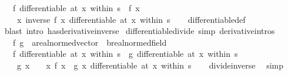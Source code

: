 \begin{isabellebody}
\ \ \ {\isachardoublequoteopen}f\ differentiable\ {\isacharparenleft}{\kern0pt}at\ x\ within\ s{\isacharparenright}{\kern0pt}\ {\isasymLongrightarrow}\ f\ x\ {\isasymnoteq}\ {}\ {\isasymLongrightarrow}\isanewline
\ \ \ \ {\isacharparenleft}{\kern0pt}{\isasymlambda}x{\isachardot}{\kern0pt}\ inverse\ {\isacharparenleft}{\kern0pt}f\ x{\isacharparenright}{\kern0pt}{\isacharparenright}{\kern0pt}\ differentiable\ {\isacharparenleft}{\kern0pt}at\ x\ within\ s{\isacharparenright}{\kern0pt}{\isachardoublequoteclose}\isanewline
%
\isadelimproof
\ \ %
\endisadelimproof
%
\isatagproof
{}\isamarkupfalse%
\ differentiable{\isacharunderscore}{\kern0pt}def\ \isamarkupfalse%
\ {\isacharparenleft}{\kern0pt}blast\ intro{\isacharcolon}{\kern0pt}\ has{\isacharunderscore}{\kern0pt}derivative{\isacharunderscore}{\kern0pt}inverse{\isacharparenright}{\kern0pt}%
\endisatagproof
{\isafoldproof}%
%
\isadelimproof
\isanewline
%
\endisadelimproof
\isanewline
{}\isamarkupfalse%
\ differentiable{\isacharunderscore}{\kern0pt}divide\ {\isacharbrackleft}{\kern0pt}simp{\isacharcomma}{\kern0pt}\ derivative{\isacharunderscore}{\kern0pt}intros{\isacharbrackright}{\kern0pt}{\isacharcolon}{\kern0pt}\isanewline
\ \ \ f\ g\ {\isacharcolon}{\kern0pt}{\isacharcolon}{\kern0pt}\ {\isachardoublequoteopen}{\isacharprime}{\kern0pt}a{\isacharcolon}{\kern0pt}{\isacharcolon}{\kern0pt}real{\isacharunderscore}{\kern0pt}normed{\isacharunderscore}{\kern0pt}vector\ {\isasymRightarrow}\ {\isacharprime}{\kern0pt}b{\isacharcolon}{\kern0pt}{\isacharcolon}{\kern0pt}real{\isacharunderscore}{\kern0pt}normed{\isacharunderscore}{\kern0pt}field{\isachardoublequoteclose}\isanewline
\ \ \ {\isachardoublequoteopen}f\ differentiable\ {\isacharparenleft}{\kern0pt}at\ x\ within\ s{\isacharparenright}{\kern0pt}\ {\isasymLongrightarrow}\ g\ differentiable\ {\isacharparenleft}{\kern0pt}at\ x\ within\ s{\isacharparenright}{\kern0pt}\ {\isasymLongrightarrow}\isanewline
\ \ \ \ g\ x\ {\isasymnoteq}\ {}\ {\isasymLongrightarrow}\ {\isacharparenleft}{\kern0pt}{\isasymlambda}x{\isachardot}{\kern0pt}\ f\ x\ {\isacharslash}{\kern0pt}\ g\ x{\isacharparenright}{\kern0pt}\ differentiable\ {\isacharparenleft}{\kern0pt}at\ x\ within\ s{\isacharparenright}{\kern0pt}{\isachardoublequoteclose}\isanewline
%
\isadelimproof
\ \ %
\endisadelimproof
%
\isatagproof
{}\isamarkupfalse%
\ divide{\isacharunderscore}{\kern0pt}inverse\ \isamarkupfalse%
\ simp%
\endisatagproof
{\isafoldproof}%
%
\isadelimproof

\end{isabellebody}
